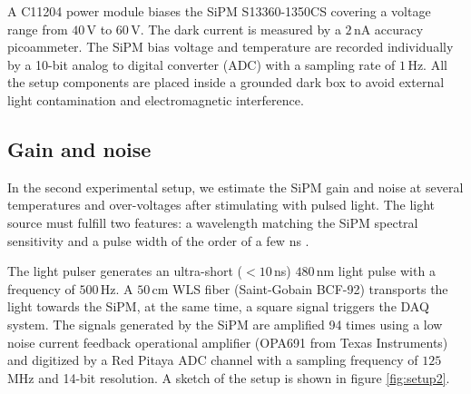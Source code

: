 \documentclass[a4paper,11pt]{article}
\begin{document}
A C11204 power module biases the SiPM S13360-1350CS covering a voltage range from $40$\,V to $60$\,V. The dark current is measured by a $2$\,nA accuracy picoammeter. The SiPM bias voltage and temperature are recorded individually by a 10-bit analog to digital converter (ADC) with a sampling rate of $1$\,Hz. All the setup components are placed inside a grounded dark box to avoid external light contamination and electromagnetic interference.

\subsection{Gain and noise}

In the second experimental setup, we estimate the SiPM gain and noise at several temperatures and over-voltages after stimulating with pulsed light. The light source must fulfill two features: a wavelength matching the SiPM spectral sensitivity and a pulse width of the order of a few ns \cite{Georgiev2016, Eigen2019}.


The light pulser generates an ultra-short ($< 10$\,ns) $480$\,nm light pulse with a frequency of $500$\,Hz. A $50$\,cm WLS fiber (Saint-Gobain BCF-92) transports the light towards the SiPM, at the same time, a square signal triggers the DAQ system. The signals generated by the SiPM are amplified 94 times using a low noise current feedback operational amplifier (OPA691 from Texas Instruments) and digitized by a Red Pitaya ADC channel with a sampling frequency of $125$\,MHz and 14-bit resolution. A sketch of the setup is shown in figure \ref{fig:setup2}.



\end{document}
